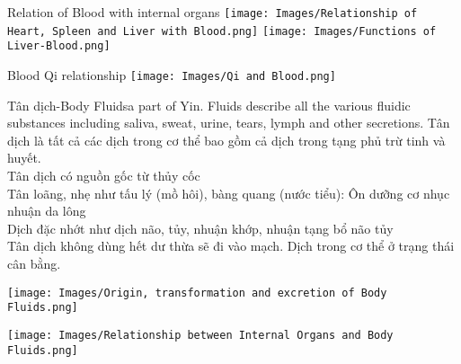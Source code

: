 \documentclass[
	11pt, %
]{beamer}
\theoremstyle{newblock}
\begin{document}
\begin{frame}{Relation of Blood with internal organs}
	\texttt{[image: Images/Relationship of Heart, Spleen and Liver with Blood.png]}
	\texttt{[image: Images/Functions of Liver-Blood.png]}
\end{frame}
\begin{frame}{Blood Qi relationship}
	\texttt{[image: Images/Qi and Blood.png]}
\end{frame}
\begin{frame}{Tân dịch-Body Fluids}{a part of Yin. Fluids describe all the various fluidic substances including saliva, sweat, urine, tears, lymph and other secretions.}
	Tân dịch là tất cả các dịch trong cơ thể bao gồm cả dịch trong tạng phủ trừ tinh và huyết.\\
	Tân dịch có nguồn gốc từ thủy cốc\\
	Tân loãng, nhẹ như tấu lý (mồ hôi), bàng quang (nước tiểu): Ôn dưỡng cơ nhục nhuận da lông\\
	Dịch đặc nhớt như dịch não, tủy, nhuận khớp, nhuận tạng bổ não tủy\\
	Tân dịch không dùng hết dư thừa sẽ đi vào mạch. Dịch trong cơ thể ở trạng thái cân bằng. 
\end{frame}
\begin{frame}
	\texttt{[image: Images/Origin, transformation and excretion of Body Fluids.png]}
\end{frame}
\begin{frame}
	\texttt{[image: Images/Relationship between Internal Organs and Body Fluids.png]}
\end{frame}
\end{document}
